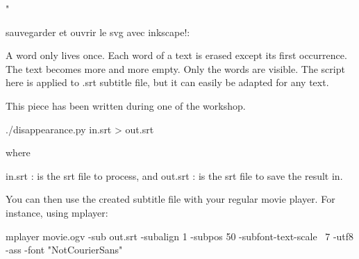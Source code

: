    \quotation{}"
\item
  sauvegarder et ouvrir le svg avec inkscape!:
\stopitemize




A word only lives once. Each word of a text is erased except its first
occurrence. The text becomes more and more empty. Only the
 words are visible. The script here is applied to
.srt subtitle file, but it can easily be adapted for any text.

\subject{About the project}

This piece has been written during one of the
\from[1]
workshop.

\subject{Usage}

\starttyping
./disappearance.py in.srt > out.srt
\stoptyping

where

in.srt : is the srt file to process, and out.srt : is the srt file to
save the result in.

You can then use the created subtitle file with your regular movie
player. For instance, using mplayer:

\starttyping
mplayer movie.ogv -sub out.srt -subalign 1 -subpos 50 -subfont-text-scale \ 
7 -utf8 -ass -font "NotCourierSans"
\stoptyping





